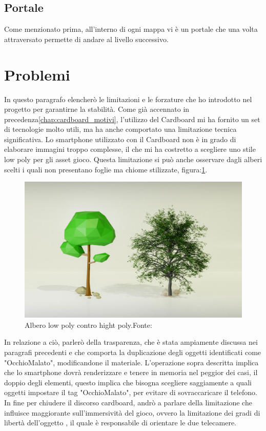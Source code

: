 \documentclass[
a4paper,
cleardoublepage=empty,
headings=twolinechapter,
numbers=autoenddot,
]{scrbook}
\begin{document}
    \subsection{Portale}
    Come menzionato prima, all'interno di ogni mappa vi è un portale che una volta attraversato permette di andare al livello successivo.
    
    \section{Problemi}
    In questo paragrafo elencherò le limitazioni e le forzature che ho introdotto nel progetto per garantirne la stabilità. Come già accennato in precedenza\ref{chap:cardboard_motivi}, l'utilizzo del Cardboard mi ha fornito un set di tecnologie molto utili, ma ha anche comportato una limitazione tecnica significativa. Lo smartphone utilizzato con il Cardboard non è in grado di elaborare immagini troppo complesse, il che mi ha costretto a scegliere uno stile low poly per gli asset  gioco.
    Questa limitazione si può anche osservare dagli alberi scelti i quali non presentano foglie ma chiome stilizzate, figura:\ref{fig:low_hight}.
    \begin{figure}[H]
		\centering
		\includegraphics[width=0.6\linewidth]{image/low_hight}
		\caption{Albero low poly contro hight poly.Fonte:\cite{low_high}}
		\label{fig:low_hight}
    \end{figure}
    In relazione a ciò, parlerò della trasparenza, che è stata ampiamente discussa nei paragrafi precedenti e che comporta la duplicazione degli oggetti identificati come "OcchioMalato", modificandone il materiale.
    L'operazione sopra descritta implica che lo smartphone dovrà renderizzare e tenere in memoria nel peggior dei casi, il doppio degli elementi, questo implica che bisogna scegliere saggiamente a quali oggetti impostare il tag "OcchioMalato", per evitare di sovraccaricare il telefono.
    In fine per chiudere il discorso cardboard, andrò a parlare della limitazione che influisce maggiorante sull'immersività del gioco, ovvero la limitazione dei gradi di libertà dell'oggetto , il quale è responsabile di orientare le due telecamere.
\end{document}
